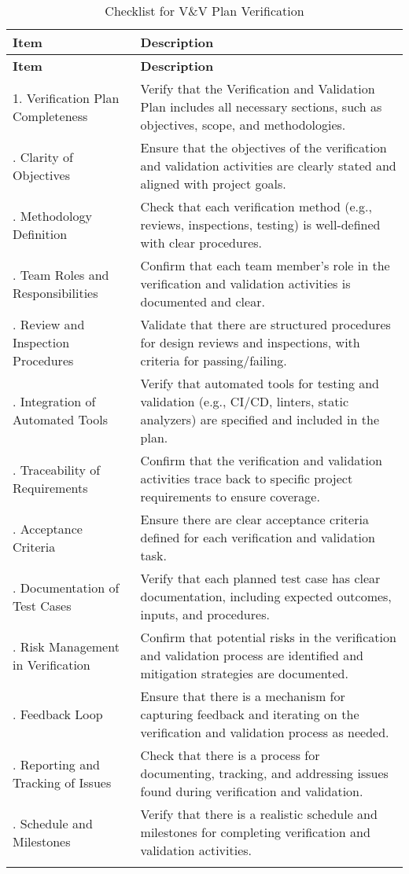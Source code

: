 \documentclass[12pt, titlepage]{article}
\begin{document}
\begin{center}
  \begin{longtable}{|>{\centering\arraybackslash}p{4cm}|p{10cm}|}
  \hline
  \textbf{Item} & \textbf{Description} \\
  \hline
  \endfirsthead
  
  \hline
  \textbf{Item} & \textbf{Description} \\
  \hline
  \endhead
  
  1. Verification Plan Completeness & Verify that the Verification and Validation Plan includes all necessary sections, such as objectives, scope, and methodologies. \\
  \hline
  2. Clarity of Objectives & Ensure that the objectives of the verification and validation activities are clearly stated and aligned with project goals. \\
  \hline
  3. Methodology Definition & Check that each verification method (e.g., reviews, inspections, testing) is well-defined with clear procedures. \\
  \hline
  4. Team Roles and Responsibilities & Confirm that each team member's role in the verification and validation activities is documented and clear. \\
  \hline
  5. Review and Inspection Procedures & Validate that there are structured procedures for design reviews and inspections, with criteria for passing/failing. \\
  \hline
  6. Integration of Automated Tools & Verify that automated tools for testing and validation (e.g., CI/CD, linters, static analyzers) are specified and included in the plan. \\
  \hline
  7. Traceability of Requirements & Confirm that the verification and validation activities trace back to specific project requirements to ensure coverage. \\
  \hline
  8. Acceptance Criteria & Ensure there are clear acceptance criteria defined for each verification and validation task. \\
  \hline
  9. Documentation of Test Cases & Verify that each planned test case has clear documentation, including expected outcomes, inputs, and procedures. \\
  \hline
  10. Risk Management in Verification & Confirm that potential risks in the verification and validation process are identified and mitigation strategies are documented. \\
  \hline
  11. Feedback Loop & Ensure that there is a mechanism for capturing feedback and iterating on the verification and validation process as needed. \\
  \hline
  12. Reporting and Tracking of Issues & Check that there is a process for documenting, tracking, and addressing issues found during verification and validation. \\
  \hline
  13. Schedule and Milestones & Verify that there is a realistic schedule and milestones for completing verification and validation activities. \\
  \hline
  \caption{Checklist for V\&V Plan Verification}
  \end{longtable}
  \end{center}
\end{document}
